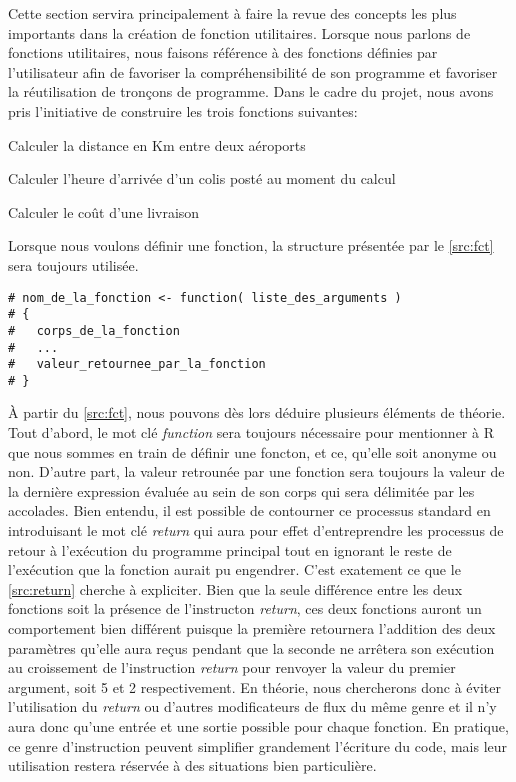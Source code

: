 Cette section servira principalement à faire la revue des concepts les plus importants dans la création de fonction utilitaires. Lorsque nous parlons de fonctions utilitaires, nous faisons référence à des fonctions définies par l'utilisateur afin de favoriser la compréhensibilité de son programme et favoriser la réutilisation de tronçons de programme. Dans le cadre du projet, nous avons pris l'initiative de construire les trois fonctions suivantes: \\
\begin{description}[style=multiline,leftmargin=2.5cm]
	\item[airportsDist] Calculer la distance en Km entre deux aéroports
	\item[arrivalTime] Calculer l'heure d'arrivée d'un colis posté au moment du calcul
	\item[shippingCost] Calculer le coût d'une livraison
\end{description}

\noindent
Lorsque nous voulons définir une fonction, la structure présentée par le \autoref{src:fct} sera toujours utilisée. 

\begin{lstlisting}[caption = Structure pour la définition d'une fonction,label=src:fct]
# nom_de_la_fonction <- function( liste_des_arguments )
# {
# 	corps_de_la_fonction
# 	... 
# 	valeur_retournee_par_la_fonction
# }
\end{lstlisting}

\vspace{\baselineskip}
\noindent
À partir du \autoref{src:fct}, nous pouvons dès lors déduire plusieurs éléments de théorie. Tout d'abord, le mot clé \emph{function} sera toujours nécessaire pour mentionner à R que nous sommes en train de définir une foncton, et ce, qu'elle soit anonyme ou non. D'autre part, la valeur retrounée par une fonction sera toujours la valeur de la dernière expression évaluée au sein de son corps qui sera délimitée par les accolades. Bien entendu, il est possible de contourner ce processus standard en introduisant le mot clé \emph{return} qui aura pour effet d'entreprendre les processus de retour à l'exécution du programme principal tout en ignorant le reste de l'exécution que la fonction aurait pu engendrer. C'est exatement ce que le \autoref{src:return} cherche à expliciter. Bien que la seule différence entre les deux fonctions soit la présence de l'instructon \emph{return}, ces deux fonctions auront un comportement bien différent puisque la première retournera l'addition des deux paramètres qu'elle aura reçus pendant que la seconde ne arrêtera son exécution au croissement de l'instruction \emph{return} pour renvoyer la valeur du premier argument, soit 5 et 2 respectivement. En théorie, nous chercherons donc à éviter l'utilisation du \emph{return} ou d'autres modificateurs de flux du même genre et il n'y aura donc qu'une entrée et une sortie possible pour chaque fonction. En pratique, ce genre d'instruction peuvent simplifier grandement l'écriture du code, mais leur utilisation restera réservée à des situations bien particulière.

